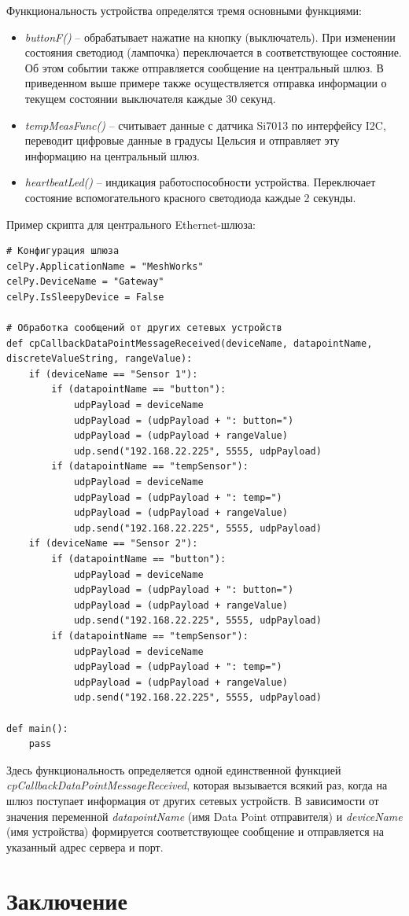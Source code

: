 \documentclass[12pt]{article}
\begin{document}
Функциональность устройства определятся тремя основными функциями:
\begin{itemize}
    \item \emph{buttonF()} -- обрабатывает нажатие на кнопку (выключатель). При 
    изменении состояния светодиод (лампочка) переключается в соответствующее состояние.
    Об этом событии также отправляется сообщение на центральный шлюз. В приведенном
    выше примере также осуществляется отправка информации о текущем состоянии выключателя
    каждые 30 секунд.
    \item \emph{tempMeasFunc()} -- считывает данные с датчика
    Si7013 по интерфейсу I2C, переводит цифровые данные в градусы Цельсия и 
    отправляет эту информацию на центральный шлюз.
    \item \emph{heartbeatLed()} -- индикация работоспособности устройства. Переключает
    состояние вспомогательного красного светодиода каждые 2 секунды.
\end{itemize}

Пример скрипта для центрального Ethernet-шлюза:
\begin{verbatim}
# Конфигурация шлюза
celPy.ApplicationName = "MeshWorks"
celPy.DeviceName = "Gateway"
celPy.IsSleepyDevice = False

# Обработка сообщений от других сетевых устройств
def cpCallbackDataPointMessageReceived(deviceName, datapointName, discreteValueString, rangeValue):
    if (deviceName == "Sensor 1"):
        if (datapointName == "button"):
            udpPayload = deviceName
            udpPayload = (udpPayload + ": button=")
            udpPayload = (udpPayload + rangeValue)
            udp.send("192.168.22.225", 5555, udpPayload)
        if (datapointName == "tempSensor"): 
            udpPayload = deviceName
            udpPayload = (udpPayload + ": temp=")
            udpPayload = (udpPayload + rangeValue)
            udp.send("192.168.22.225", 5555, udpPayload) 
    if (deviceName == "Sensor 2"):
        if (datapointName == "button"):
            udpPayload = deviceName
            udpPayload = (udpPayload + ": button=")
            udpPayload = (udpPayload + rangeValue)
            udp.send("192.168.22.225", 5555, udpPayload)
        if (datapointName == "tempSensor"): 
            udpPayload = deviceName
            udpPayload = (udpPayload + ": temp=") 
            udpPayload = (udpPayload + rangeValue)
            udp.send("192.168.22.225", 5555, udpPayload)  
   
def main(): 
    pass

\end{verbatim}

Здесь функциональность определяется одной единственной функцией 
\emph{cpCallbackDataPointMessageReceived}, которая вызывается всякий раз, когда 
на шлюз поступает информация от других сетевых устройств. В зависимости от значения
переменной \emph{datapointName} (имя Data Point отправителя) и \emph{deviceName} (имя 
устройства) формируется соответствующее сообщение и отправляется на указанный адрес
сервера и порт.
\section{Заключение}
\end{document}
